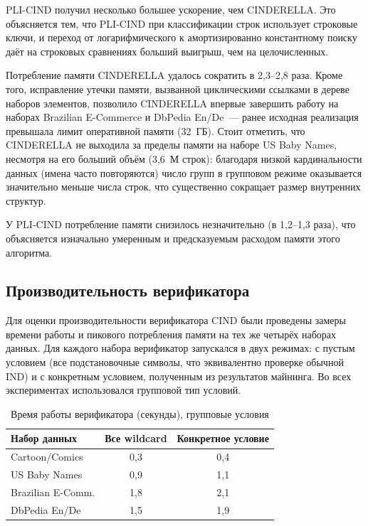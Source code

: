 PLI-CIND получил несколько большее ускорение, чем CINDERELLA. Это объясняется тем, что PLI-CIND при классификации строк использует строковые ключи, и переход от логарифмического к амортизированно константному поиску даёт на строковых сравнениях больший выигрыш, чем на целочисленных.

Потребление памяти CINDERELLA удалось сократить в 2{,}3--2{,}8 раза. Кроме того, исправление утечки памяти, вызванной циклическими ссылками в дереве наборов элементов, позволило CINDERELLA впервые завершить работу на наборах Brazilian E-Commerce и DbPedia En/De~--- ранее исходная реализация превышала лимит оперативной памяти (32~ГБ). Стоит отметить, что CINDERELLA не выходила за пределы памяти на наборе US Baby Names, несмотря на его больший объём (3{,}6~М строк): благодаря низкой кардинальности данных (имена часто повторяются) число групп в групповом режиме оказывается значительно меньше числа строк, что существенно сокращает размер внутренних структур.

У PLI-CIND потребление памяти снизилось незначительно (в 1{,}2--1{,}3 раза), что объясняется изначально умеренным и предсказуемым расходом памяти этого алгоритма.

\subsection{Производительность верификатора}

Для оценки производительности верификатора CIND были проведены замеры времени работы и пикового потребления памяти на тех же четырёх наборах данных. Для каждого набора верификатор запускался в двух режимах: с пустым условием (все подстановочные символы, что эквивалентно проверке обычной IND) и с конкретным условием, полученным из результатов майнинга. Во всех экспериментах использовался групповой тип условий.

\begin{table}[h]
\centering
\caption{Время работы верификатора (секунды), групповые условия}
\label{tab:verifier_time}
\begin{tabular}{|l|c|c|}
\hline
Набор данных & Все wildcard & Конкретное условие \\
\hline
Cartoon/Comics & 0{,}3 & 0{,}4 \\
US Baby Names & 0{,}9 & 1{,}1 \\
Brazilian E-Comm. & 1{,}8 & 2{,}1 \\
DbPedia En/De & 1{,}5 & 1{,}9 \\
\hline
\end{tabular}
\end{table}

